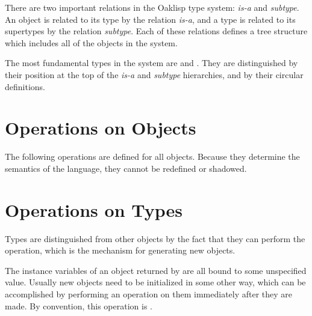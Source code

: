 There are two important relations in the Oaklisp type system: {\it
is-a} and \emph{subtype}.  An object is related to its type by the
relation \emph{is-a}, and a type is related to its supertypes by the
relation \emph{subtype}.  Each of these relations defines a tree
structure which includes all of the objects in the system.

The most fundamental types in the system are  and
.  They are distinguished by their position at the top of
the \emph{is-a} and \emph{subtype} hierarchies, and by their circular
definitions.



\section{Operations on Objects}

The following operations are defined for all objects.  Because they
determine the semantics of the language, they cannot be redefined or shadowed.





\section{Operations on Types}

Types are distinguished from other objects by the fact that they can
perform the  operation, which is the mechanism for generating
new objects.


The instance variables of an object returned by  are
all bound to some unspecified value.  Usually new objects need to be
initialized in some other way, which can be accomplished by performing
an operation on them immediately after they are made.  By convention,
this operation is .

